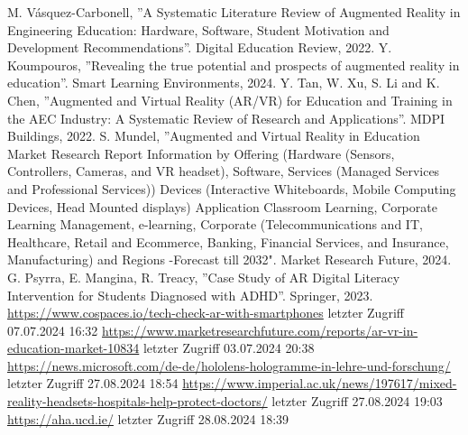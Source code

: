 \documentclass[conference]{IEEEtran}
\begin{document}
\begin{thebibliography}{00}
     M. Vásquez-Carbonell, ''A Systematic Literature Review of Augmented Reality in Engineering Education: Hardware, Software, Student Motivation and Development Recommendations''. Digital Education Review, 2022.
     Y. Koumpouros, ''Revealing the true potential and prospects of augmented reality in education''. Smart Learning Environments, 2024.
     Y. Tan, W. Xu, S. Li and K. Chen, ''Augmented and Virtual Reality (AR/VR) for Education and Training in the AEC Industry: A Systematic Review of Research and Applications''. MDPI Buildings, 2022.
     S. Mundel, ''Augmented and Virtual Reality in Education Market Research Report Information by Offering (Hardware (Sensors, Controllers, Cameras, and VR headset), Software, Services (Managed Services and Professional Services)) Devices (Interactive Whiteboards, Mobile Computing Devices, Head Mounted displays) Application Classroom Learning, Corporate Learning Management, e-learning, Corporate (Telecommunications and IT, Healthcare, Retail and Ecommerce, Banking, Financial Services, and Insurance, Manufacturing) and Regions -Forecast till 2032". Market Research Future, 2024.
     G. Psyrra, E. Mangina, R. Treacy, ''Case Study of AR Digital Literacy Intervention for Students Diagnosed with ADHD''. Springer, 2023.
     \href{https://www.cospaces.io/tech-check-ar-with-smartphones}{https://www.cospaces.io/tech-check-ar-with-smartphones} letzter Zugriff 07.07.2024 16:32
     \href{https://www.marketresearchfuture.com/reports/ar-vr-in-education-market-10834}{https://www.marketresearchfuture.com/reports/ar-vr-in-education-market-10834} letzter Zugriff 03.07.2024 20:38
     \href{https://news.microsoft.com/de-de/hololens-hologramme-in-lehre-und-forschung/}{https://news.microsoft.com/de-de/hololens-hologramme-in-lehre-und-forschung/} letzter Zugriff 27.08.2024 18:54
     \href{https://www.imperial.ac.uk/news/197617/mixed-reality-headsets-hospitals-help-protect-doctors/}{https://www.imperial.ac.uk/news/197617/mixed-reality-headsets-hospitals-help-protect-doctors/} letzter Zugriff 27.08.2024 19:03
     \href{https://aha.ucd.ie/}{https://aha.ucd.ie/} letzter Zugriff 28.08.2024 18:39
\end{thebibliography}
\vspace{12pt}
\end{document}
